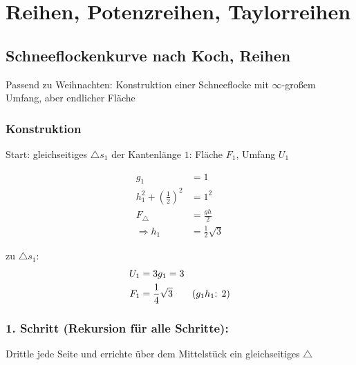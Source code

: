 \section{Reihen, Potenzreihen, Taylorreihen}

\subsection{Schneeflockenkurve nach Koch, Reihen}

Passend zu Weihnachten: Konstruktion einer Schneeflocke mit $\infty$-großem Umfang, aber endlicher Fläche

\subsubsection*{Konstruktion}
Start: gleichseitiges $\triangle s_1$ der Kantenlänge $1$: Fläche $F_1$, Umfang $U_1$

\begin{center}
\end{center}

\begin{align*}
    g_1 &= 1 \\
    h_1^2 + \left(\frac{1}{2}\right)^2 &= 1^2 \\
    F_{\triangle} &= \frac{g h}{2} \\
    \Rightarrow h_1 &= \frac{1}{2} \sqrt{3}
\end{align*}

zu $\triangle s_1$:
\begin{align*}
    U_1 &= 3 g_1 = 3 \\
    F_1 &= \frac{1}{4} \sqrt{3} \hspace{20px} \text{($g_1 h_1$: 2)}
\end{align*}

\subsubsection*{1. Schritt (Rekursion für alle Schritte):}

Drittle jede Seite und errichte über dem Mittelstück ein gleichseitiges $\triangle$


